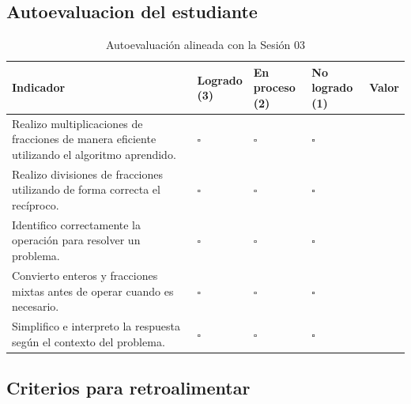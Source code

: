 \documentclass[
	spanish,
	letterpaper, oneside
]{article}
\begin{document}
\subsection{Autoevaluacion del estudiante}

\begin{table}[H]
\centering
\caption{Autoevaluación alineada con la Sesión 03}
\label{tab:autoevaluacion-sesion03}

\small
\renewcommand{\arraystretch}{1.45}
\setlength{\tabcolsep}{5pt}

\begin{tabularx}{\textwidth}{@{}
>{\raggedright\arraybackslash}X
>{\centering\arraybackslash}p{}
>{\centering\arraybackslash}p{}
>{\centering\arraybackslash}p{}
>{\centering\arraybackslash}p{}
@{}}
\toprule
\textbf{Indicador} &
\makecell{\textbf{Logrado}\\\textbf{(3)}} &
\makecell{\textbf{En proceso}\\\textbf{(2)}} &
\makecell{\textbf{No logrado}\\\textbf{(1)}} &
\textbf{Valor} \\
\midrule

Realizo multiplicaciones de fracciones de manera eficiente utilizando el algoritmo aprendido. 
& $\square$ & $\square$ & $\square$ & \\

Realizo divisiones de fracciones utilizando de forma correcta el recíproco. 
& $\square$ & $\square$ & $\square$ & \\

Identifico correctamente la operación para resolver un problema. 
& $\square$ & $\square$ & $\square$ & \\

Convierto enteros y fracciones mixtas antes de operar cuando es necesario. 
& $\square$ & $\square$ & $\square$ & \\

Simplifico e interpreto la respuesta según el contexto del problema. 
& $\square$ & $\square$ & $\square$ & \\

\bottomrule
\end{tabularx}

\end{table}

\subsection{Criterios para retroalimentar}
\end{document}
